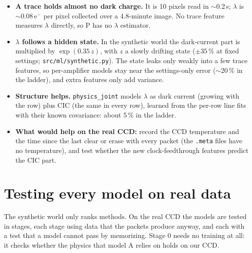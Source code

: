 \documentclass[10pt]{article}
\newcommand{\code}[1]{\texttt{#1}}
\begin{document}
\begin{itemize}
\item \textbf{A trace holds almost no dark charge.} It is 10 pixels read in $\sim$0.2\,s; $\lambda$ is $\sim$0.08\,e$^-$ per pixel collected
  over a 4.8-minute image. No trace feature measures $\lambda$ directly, so P has no $\lambda$ estimator.
\item \textbf{$\lambda$ follows a hidden state.} In the synthetic world the dark-current part is multiplied by $\exp(0.35\,z)$, with $z$ a
  slowly drifting state ($\pm35$\,\% at fixed settings; \code{src/ml/synthetic.py}). The state leaks only weakly into a few trace features,
  so per-amplifier models stay near the settings-only error ($\sim$20\,\% in the ladder), and extra features only add variance.
\item \textbf{Structure helps.} \code{physics\_joint} models $\lambda$ as dark current (growing with the row) plus CIC (the same in every row),
  learned from the per-row line fits with their known covariance: about 5\,\% in the ladder.
\item \textbf{What would help on the real CCD:} record the CCD temperature and the time since the last clear or erase with every packet
  (the \code{.meta} files have no temperature), and test whether the new clock-feedthrough features predict the CIC part.
\end{itemize}


\clearpage
\section{Testing every model on real data}
\label{sec:realtest}

\begin{basic}
The synthetic world only ranks methods. On the real CCD the models are tested in stages, each stage using data that the packets
produce anyway, and each with a test that a model cannot pass by memorizing. Stage 0 needs no training at all: it checks whether the
physics that model A relies on holds on our CCD.
\end{basic}
\end{document}
